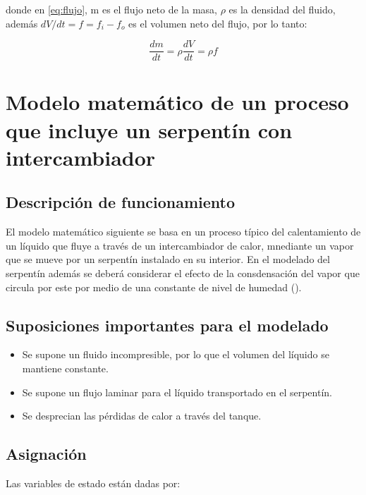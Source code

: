 \documentclass[12pt,letterpaper]{article}     %
\begin{document}
donde en \ref{eq:flujo}, m es el flujo neto de la masa, $\rho$ es la densidad del fluido, además $dV/dt = f = f_i - f_o$ es el volumen neto del flujo, por lo tanto:

\begin{equation}
\frac{dm}{dt} = \rho \frac{dV}{dt} = \rho f     
\label{eq:flujo}
\end{equation}

\newpage
\section{Modelo matemático de un proceso que incluye un serpentín con intercambiador }

\subsection{Descripción de funcionamiento}

El modelo matemático siguiente se basa en un proceso típico del calentamiento de un líquido que fluye a través de un intercambiador de calor, mnediante un vapor que se mueve por un serpentín instalado en su interior. En el modelado del serpentín además se deberá considerar el efecto de la consdensación del vapor que circula por este por medio de una constante de nivel de humedad (\lambda).



\subsection{Suposiciones importantes para el modelado}

\begin{itemize}
    
\item Se supone un fluido incompresible, por lo que el volumen del líquido se mantiene constante.

\item Se supone un flujo laminar para el líquido transportado en el serpentín.

\item Se desprecian las pérdidas de calor a través del tanque.
\end{itemize}


\subsection{Asignación}

Las variables de estado están dadas por:
\end{document}
